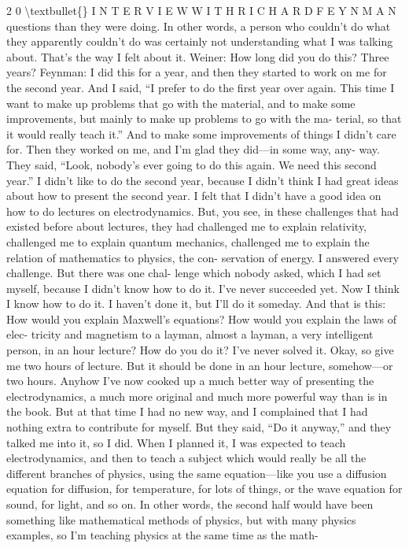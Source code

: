 \documentclass[10pt,oneside]{article}
\begin{document}
2 0 \textbackslash{}textbullet\{\} I N T E R V I E W  W I T H  R I C H A R D  F E Y N M A N questions than they were doing. In other words, a person who couldn’t do what they apparently couldn’t do was certainly not understanding what I was talking about. That’s the way I felt about it. Weiner: How long did you do this? Three years? Feynman: I did this for a year, and then they started to work on me for the second year. And I said, “I prefer to do the first year over again. This time I want to make up problems that go with the material, and to make some improvements, but mainly to make up problems to go with the ma- terial, so that it would really teach it.” And to make some improvements of things I didn’t care for. Then they worked on me, and I’m glad they did---in some way, any- way. They said, “Look, nobody’s ever going to do this again. We need this second year.” I didn’t like to do the second year, because I didn’t think I had great ideas about how to present the second year. I felt that I didn’t have a good idea on how to do lectures on electrodynamics. But, you see, in these challenges that had existed before about lectures, they had challenged me to explain relativity, challenged me to explain quantum mechanics, challenged me to explain the relation of mathematics to physics, the con- servation of energy. I answered every challenge. But there was one chal- lenge which nobody asked, which I had set myself, because I didn’t know how to do it. I’ve never succeeded yet. Now I think I know how to do it. I haven’t done it, but I’ll do it someday. And that is this: How would you explain Maxwell’s equations? How would you explain the laws of elec- tricity and magnetism to a layman, almost a layman, a very intelligent person, in an hour lecture? How do you do it? I’ve never solved it. Okay, so give me two hours of lecture. But it should be done in an hour lecture, somehow---or two hours. Anyhow I’ve now cooked up a much better way of presenting the electrodynamics, a much more original and much more powerful way than is in the book. But at that time I had no new way, and I complained that I had nothing extra to contribute for myself. But they said, “Do it anyway,” and they talked me into it, so I did. When I planned it, I was expected to teach electrodynamics, and then to teach a subject which would really be all the different branches of physics, using the same equation---like you use a diffusion equation for diffusion, for temperature, for lots of things, or the wave equation for sound, for light, and so on. In other words, the second half would have been something like mathematical methods of physics, but with many physics examples, so I’m teaching physics at the same time as the math-\par
\end{document}

